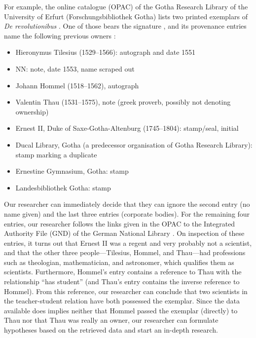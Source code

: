 For example, the online catalogue (OPAC) of the Gotha Research Library of the University of Erfurt (Forschungsbibliothek Gotha) lists two printed exemplars
of \emph{De revolutionibus} \autocite{OPACDeRev}.
One of those bears the signature , and its provenance entries name the following previous owners  \autocite{OPACDeRevPPN}:
%
\begin{itemize}
  \item
    Hieronymus Tilesius (1529–1566): autograph and date 1551
  \item
    NN: note, date 1553, name scraped out
  \item
    Johann Hommel (1518–1562), autograph
  \item
    Valentin Thau (1531–1575), note (greek proverb, possibly not denoting ownership)
  \item
    Ernest II, Duke of Saxe-Gotha-Altenburg (1745–1804): stamp/seal, initial
  \item
    Ducal Library, Gotha (a predecessor organisation of Gotha Research Library): stamp marking a duplicate
  \item
    Ernestine Gymnasium, Gotha: stamp
  \item
    Landesbibliothek Gotha: stamp
\end{itemize}
%
Our researcher can immediately decide that they can ignore the second entry (no name given) and the last three entries (corporate bodies).
For the remaining four entries, our researcher follows the links given in the OPAC to the Integrated Authority File (GND) of the German National Library \autocite{DNBCatalogue}.
On inspection of these entries, it turns out that Ernest II was a regent and very probably not a scientist,
and that the other three people---Tilesius, Hommel, and Thau---had professions such as theologian,
mathematician, and astronomer, which qualifies them as scientists. Furthermore, Hommel's entry
contains a reference to Thau with the relationship \enquote{has student}
(and Thau's entry contains the inverse reference to Hommel).
From this reference, our researcher can conclude that two scientists in the teacher-student relation
have both possessed the exemplar. Since the data available does implies neither that Hommel passed the exemplar (directly) to Thau
nor that Thau was really an owner,
our researcher can formulate hypotheses based on the retrieved data and start an in-depth research.

